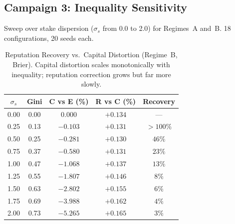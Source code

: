 \documentclass[9pt,oneside]{amsart}
\begin{document}
\subsection{Campaign 3: Inequality Sensitivity}

Sweep over stake dispersion ($\sigma_s$ from 0.0 to 2.0) for Regimes~A and~B. 18 configurations, 20 seeds each.

\begin{table}[h]
\centering
\small
\begin{tabular}{@{}ccccc@{}}
\toprule
$\sigma_s$ & \textbf{Gini} & \textbf{C vs E (\%)} & \textbf{R vs C (\%)} & \textbf{Recovery} \\
\midrule
0.00 & 0.00 & $0.000$   & $+0.134$ & --- \\
0.25 & 0.13 & $-0.103$  & $+0.131$ & ${>}100\%$ \\
0.50 & 0.25 & $-0.281$  & $+0.130$ & $46\%$ \\
0.75 & 0.37 & $-0.580$  & $+0.131$ & $23\%$ \\
1.00 & 0.47 & $-1.068$  & $+0.137$ & $13\%$ \\
1.25 & 0.55 & $-1.807$  & $+0.146$ & $8\%$ \\
1.50 & 0.63 & $-2.802$  & $+0.155$ & $6\%$ \\
1.75 & 0.69 & $-3.988$  & $+0.162$ & $4\%$ \\
2.00 & 0.73 & $-5.265$  & $+0.165$ & $3\%$ \\
\bottomrule
\end{tabular}
\caption{Reputation Recovery vs.\ Capital Distortion (Regime~B, Brier). Capital distortion scales monotonically with inequality; reputation correction grows but far more slowly.}
\end{table}
\end{document}
